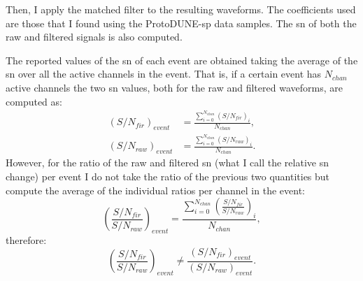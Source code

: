 Then, I apply the matched filter to the resulting waveforms. The coefficients used are those that I found using the ProtoDUNE-\gls{sp} data samples. The \gls{sn} of both the raw and filtered signals is also computed.

The reported values of the \gls{sn} of each event are obtained taking the average of the \gls{sn} over all the active channels in the event. That is, if a certain event has $N_{chan}$ active channels the two \gls{sn} values, both for the raw and filtered waveforms, are computed as:
\begin{equation}
\begin{split}
\left(S/N_{fir}\right)_{event} &= \frac{\sum_{i=0}^{N_{chan}} \left(S/N_{fir}\right)_{i}}{N_{chan}},\\
\left(S/N_{raw}\right)_{event} &= \frac{\sum_{i=0}^{N_{chan}} \left(S/N_{raw}\right)_{i}}{N_{chan}}.
\end{split}
\end{equation}
However, for the ratio of the raw and filtered \gls{sn} (what I call the relative \gls{sn} change) per event I do not take the ratio of the previous two quantities but compute the average of the individual ratios per channel in the event:
\begin{equation}
\left(\frac{S/N_{fir}}{S/N_{raw}}\right)_{event} = \frac{\sum_{i=0}^{N_{chan}} \left(\frac{S/N_{fir}}{S/N_{raw}}\right)_{i}}{N_{chan}},
\end{equation}
therefore:
\begin{equation}
\left(\frac{S/N_{fir}}{S/N_{raw}}\right)_{event}  \neq \frac{\left(S/N_{fir}\right)_{event}}{\left(S/N_{raw}\right)_{event}}.
\end{equation}

